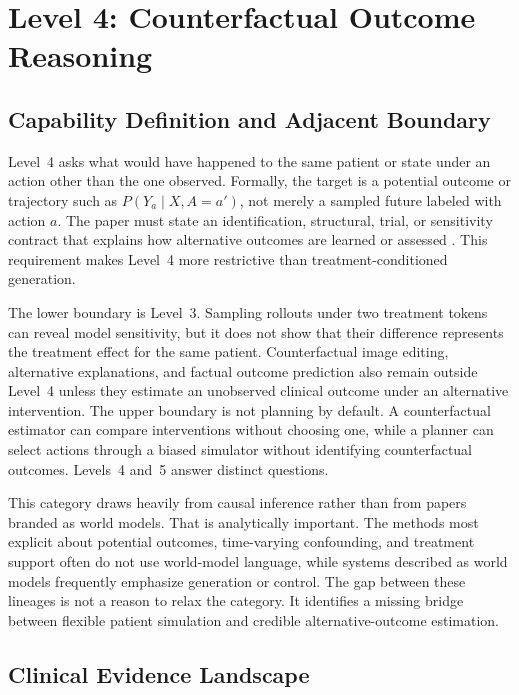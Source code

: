 \section{Level 4: Counterfactual Outcome Reasoning}
\label{sec:level4}

\subsection{Capability Definition and Adjacent Boundary}

Level~4 asks what would have happened to the same patient or state under an action other than the one observed. Formally, the target is a potential outcome or trajectory such as $P(Y_a\mid X,A{=}a')$, not merely a sampled future labeled with action $a$. The paper must state an identification, structural, trial, or sensitivity contract that explains how alternative outcomes are learned or assessed \citep{Pearl2009Causality,PearlMackenzie2018BookOfWhy}. This requirement makes Level~4 more restrictive than treatment-conditioned generation.

The lower boundary is Level~3. Sampling rollouts under two treatment tokens can reveal model sensitivity, but it does not show that their difference represents the treatment effect for the same patient. Counterfactual image editing, alternative explanations, and factual outcome prediction also remain outside Level~4 unless they estimate an unobserved clinical outcome under an alternative intervention. The upper boundary is not planning by default. A counterfactual estimator can compare interventions without choosing one, while a planner can select actions through a biased simulator without identifying counterfactual outcomes. Levels~4 and~5 answer distinct questions.

This category draws heavily from causal inference rather than from papers branded as world models. That is analytically important. The methods most explicit about potential outcomes, time-varying confounding, and treatment support often do not use world-model language, while systems described as world models frequently emphasize generation or control. The gap between these lineages is not a reason to relax the category. It identifies a missing bridge between flexible patient simulation and credible alternative-outcome estimation.

\subsection{Clinical Evidence Landscape}

